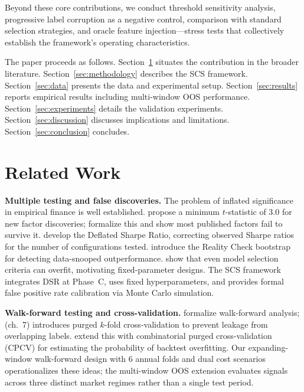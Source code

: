 \documentclass[12pt,a4paper]{article}
\begin{document}
Beyond these core contributions, we conduct threshold sensitivity analysis, progressive label corruption as a negative control, comparison with standard selection strategies, and oracle feature injection---stress tests that collectively establish the framework's operating characteristics.

The paper proceeds as follows. Section~\ref{sec:literature} situates the contribution in the broader literature. Section~\ref{sec:methodology} describes the SCS framework. Section~\ref{sec:data} presents the data and experimental setup. Section~\ref{sec:results} reports empirical results including multi-window OOS performance. Section~\ref{sec:experiments} details the validation experiments. Section~\ref{sec:discussion} discusses implications and limitations. Section~\ref{sec:conclusion} concludes.


\section{Related Work}
\label{sec:literature}

\textbf{Multiple testing and false discoveries.} The problem of inflated significance in empirical finance is well established. \citet{harvey2015backtesting} propose a minimum $t$-statistic of 3.0 for new factor discoveries; \citet{harvey2016cross} formalize this and show most published factors fail to survive it. \citet{bailey2014deflated} develop the Deflated Sharpe Ratio, correcting observed Sharpe ratios for the number of configurations tested. \citet{white2000reality} introduce the Reality Check bootstrap for detecting data-snooped outperformance. \citet{cawley2010overfitting} show that even model selection criteria can overfit, motivating fixed-parameter designs. The SCS framework integrates DSR at Phase~C, uses fixed hyperparameters, and provides formal false positive rate calibration via Monte Carlo simulation.

\textbf{Walk-forward testing and cross-validation.} \citet{pardo2008evaluation} formalize walk-forward analysis; \citet{lopez2018advances} (ch.~7) introduces purged $k$-fold cross-validation to prevent leakage from overlapping labels. \citet{bailey2017probability} extend this with combinatorial purged cross-validation (CPCV) for estimating the probability of backtest overfitting. Our expanding-window walk-forward design with 6 annual folds and dual cost scenarios operationalizes these ideas; the multi-window OOS extension evaluates signals across three distinct market regimes rather than a single test period.
\end{document}
